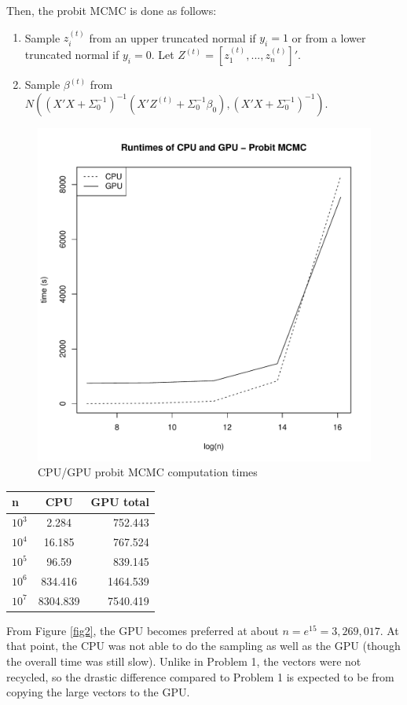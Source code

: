 \documentclass{article}
\begin{document}
Then, the probit MCMC is done as follows:
\begin{enumerate}
\item Sample $z_i^{(t)}$ from an upper truncated normal if $y_i=1$ or from a lower truncated normal if $y_i=0$. Let $Z^{(t)}=[z_1^{(t)}, ..., z_n^{(t)}]'.$
\item Sample $\beta^(t)$ from $N((X'X+\Sigma_0^{-1})^{-1}(X'Z^{(t)}+\Sigma_0^{-1}\beta_0), (X'X+\Sigma_0^{-1})^{-1}).$
\end{enumerate}

\begin{figure}
\center
\includegraphics[width=.6\textwidth]{Q2Plot.pdf}
\caption{CPU/GPU probit MCMC computation times}
\label{fig2}
\end{figure}

\begin{center}
  \begin{tabular}{ |l | c | r| }
    \hline
n & CPU & GPU total\\ \hline
$10^3$ & 2.284 & 752.443\\
$10^4$ & 16.185 & 767.524\\
$10^5$ & 96.59 & 839.145\\
$10^6$ & 834.416 & 1464.539\\
$10^7$ & 8304.839 & 7540.419\\
    \hline
  \end{tabular}
\end{center}

From Figure \eqref{fig2}, the GPU becomes preferred at about $n=e^{15} = 3,269,017$. At that point, the CPU was not able to do the sampling as well as the GPU (though the overall time was still slow). Unlike in Problem 1, the vectors were not recycled, so the drastic difference compared to Problem 1 is expected to be from copying the large vectors to the GPU.
\end{document}
